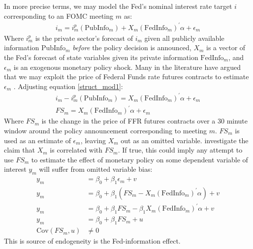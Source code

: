 \documentclass[a4paper,man,floatsintext,natbib]{apa6}
\begin{document}
	In more precise terms, we may model the Fed's nominal interest rate target \(i\) corresponding to an FOMC meeting \(m\) as:
	\begin{align*}
		i_m = i_m^p(\text{PubInfo}_m) + X_m(\text{FedInfo}_m)^\prime \alpha + \epsilon_m \tag{2} \label{struct_mod1}
	\end{align*}
	Where \(i_m^p\) is the private sector's forecast of \(i_m\) given all publicly available information \(\text{PubInfo}_m\) \textit{before} the policy decision is announced, \(X_m\) is a vector of the Fed's forecast of state variables given its private information \(\text{FedInfo}_m\), and \(\epsilon_m\) is an exogenous monetary policy shock. Many in the literature have argued that we may exploit the price of Federal Funds rate futures contracts to estimate \(\epsilon_m\) \citep{Gurkaynak2011,Gertler2015, Nakamura2018}. Adjusting equation \ref{struct_mod1}:
	\begin{align*}
		i_m - i_m^p(\text{PubInfo}_m) = X_m(\text{FedInfo}_m)^\prime \alpha + \epsilon_m \\
		FS_m = X_m(\text{FedInfo}_m)^\prime \alpha + \epsilon_m \tag{3} \label{model}
	\end{align*}
	Where \(FS_m\) is the change in the price of FFR futures contracts over a 30 minute window around the policy announcement corresponding to meeting \(m\). \(FS_m\) is used as an estimate of \(\epsilon_m\), leaving \(X_m\) out as an omitted variable. \cite{Bauer2020} investigate the claim that \(X_m\) is correlated with \(FS_m\). If true, this could imply any attempt to use \(FS_m\) to estimate the effect of monetary policy on some dependent variable of interest \(y_m\) will suffer from omitted variable bias:
	\begin{align*}
		y_m &= \beta_0 + \beta_1 \epsilon_m  + v \\
		y_m &= \beta_0 + \beta_1(FS_m - X_m(\text{FedInfo}_m)^\prime \alpha )  + v \\
		y_m &= \beta_0 + \beta_1FS_m - \beta_1 X_m(\text{FedInfo}_m)^\prime \alpha + v \\
		y_m &= \beta_0 + \beta_1FS_m + u \tag{4} \label{eq3} \\ 
		\mathrm{Cov}(FS_m, u) &\neq 0 
	\end{align*}
	This is source of endogeneity is the Fed-information effect.
\end{document}
